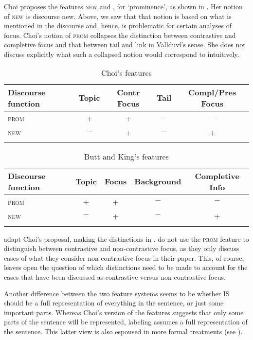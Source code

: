\documentclass[output=paper,hidelinks]{langscibook}
\begin{document}
Choi proposes the features {\pm\textsc{new}} and \textsc{\pm{}}, for `prominence', as shown in .  Her notion of \textsc{new} is  discourse new. Above, we saw that that notion is based on what is mentioned in the discourse and, hence, is problematic for certain analyses of focus. Choi's notion of \textsc{prom} collapses the distinction between contrastive and completive focus and that between tail and link in Vallduv\'{i}'s sense. She does not discuss explicitly what such a collapsed notion would correspond to intuitively.

\begin{table}
\begin{tabularx}{\textwidth}{lCcCc}
\lsptoprule
Discourse function    & Topic & Contr Focus & Tail & Compl/Pres Focus  \\
\midrule
\textsc{prom} & + & + & $-$ & $-$   \\
\textsc{new} & $-$ & + & $-$ & + \\
\lspbottomrule
\end{tabularx}
\caption{Choi's features}\label{table:IS:Choi}
\end{table}

\begin{table}
\begin{tabularx}{\textwidth}{lCCcc}
\lsptoprule
Discourse function    & Topic & Focus & Background & Completive Info  \\
\midrule
\textsc{prom} & + & + & $-$ & $-$   \\
\textsc{new} & $-$ & + & $-$ & + \\
\lspbottomrule
\end{tabularx}
\caption{Butt and King's features}\label{table:IS:BK}
\end{table}

\citet{BK96} adapt Choi's proposal, making the distinctions in . \citet{BK96} do not use the \textsc{prom} feature to distinguish between contrastive and non-contrastive focus,  as they only discuss cases of what they consider non-contrastive focus in their paper. This, of course, leaves open the question of which distinctions need to be made to account for the cases that have been discussed as contrastive versus non-contrastive focus. 

Another difference between the two feature systems seems to be whether IS should be a full representation of everything in the sentence, or just some important parts. Whereas Choi's version of the features suggests that only some parts of the sentence will be represented,  labeling assumes a full representation of the sentence. This latter view is also espoused in more formal treatments (see ).
\end{document}
